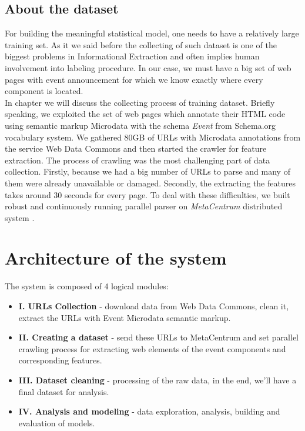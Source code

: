 \subsection*{About the dataset}
For building the meaningful statistical model, one needs to have a relatively large training set. As it we said before the collecting of such dataset is one of the biggest problems in Informational Extraction and often implies human involvement into labeling procedure. In our case, we must have a big set of web pages with event announcement for which we know exactly where every component is located.\\  

In chapter  we will discuss the collecting process of training dataset. Briefly speaking, we exploited the set of web pages which annotate their HTML code using semantic markup Microdata with the schema \textit{Event} from Schema.org vocabulary system. We gathered 80GB of URLs with Microdata annotations from the service Web Data Commons and then started the crawler for feature extraction. The process of crawling was the most challenging part of data collection. Firstly, because we had a big number of URLs to parse and many of them were already unavailable or damaged. Secondly, the extracting the features takes around 30 seconds for every page. To deal with these difficulties, we built robust and continuously running parallel parser on \textit{MetaCentrum} distributed system \cite{MetaCentrum}. 

\section{Architecture of the system}
\label{sec:arch}

The system is composed of 4 logical modules:

\begin{itemize}
    \item \textbf{I. URLs Collection} - download data from Web Data Commons, clean it, extract the URLs with Event Microdata semantic markup.
    \item \textbf{II. Creating a dataset} - send these URLs to MetaCentrum and set parallel crawling process for extracting web elements of the event components and corresponding features.
    \item \textbf{III. Dataset cleaning} - processing of the raw data, in the end, we'll have a final dataset for analysis.
    \item \textbf{IV. Analysis and modeling} - data exploration, analysis, building and evaluation of models.
\end{itemize}

